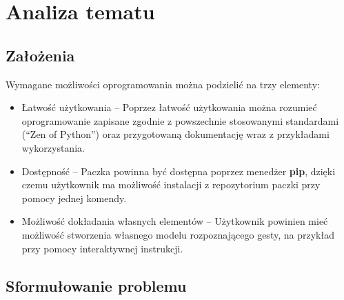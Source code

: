 \chapter{Analiza tematu}



\section{Założenia}

\quad Wymagane możliwości oprogramowania można podzielić na trzy elementy:

\begin{itemize}
    \item Łatwość użytkowania -- Poprzez łatwość użytkowania można rozumieć oprogramowanie zapisane zgodnie z powszechnie stosowanymi standardami (\enquote{Zen of Python}) oraz przygotowaną dokumentację wraz z przykładami wykorzystania. 
    \item Dostępność -- Paczka powinna być dostępna poprzez menedżer \textbf{pip}, dzięki czemu użytkownik ma możliwość instalacji z repozytorium paczki przy pomocy jednej komendy.
    \item Możliwość dokładania własnych elementów -- Użytkownik powinien mieć możliwość stworzenia własnego modelu rozpoznającego gesty, na przykład przy pomocy interaktywnej instrukcji.
\end{itemize}


\section {Sformułowanie problemu}


